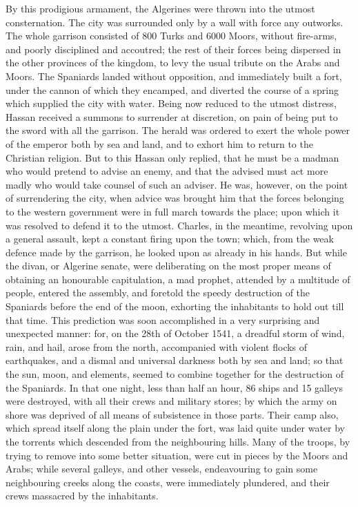 \documentclass{article}
\begin{document}
By this prodigious armament, the Algerines were thrown into the utmost consternation. The city was surrounded only by a wall with force any outworks. The whole garrison consisted of 800 Turks and 6000 Moors, without fire-arms, and poorly disciplined and accoutred; the rest of their forces being dispersed in the other provinces of the kingdom, to levy the usual tribute on the Arabs and Moors. The Spaniards landed without opposition, and immediately built a fort, under the cannon of which they encamped, and diverted the course of a spring which supplied the city with water. Being now reduced to the utmost distress, Hassan received a summons to surrender at discretion, on pain of being put to the sword with all the garrison. The herald was ordered to exert the whole power of the emperor both by sea and land, and to exhort him to return to the Christian religion. But to this Hassan only replied, that he must be a madman who would pretend to advise an enemy, and that the advised must act more madly who would take counsel of such an adviser. He was, however, on the point of surrendering the city, when advice was brought him that the forces belonging to the western government were in full march towards the place; upon which it was resolved to defend it to the utmost. Charles, in the meantime, revolving upon a general assault, kept a constant firing upon the town; which, from the weak defence made by the garrison, he looked upon as already in his hands. But while the divan, or Algerine senate, were deliberating on the most proper means of obtaining an honourable capitulation, a mad prophet, attended by a multitude of people, entered the assembly, and foretold the speedy destruction of the Spaniards before the end of the moon, exhorting the inhabitants to hold out till that time. This prediction was soon accomplished in a very surprising and unexpected manner: for, on the 28th of October 1541, a dreadful storm of wind, rain, and hail, arose from the north, accompanied with violent flocks of earthquakes, and a dismal and universal darkness both by sea and land; so that the sun, moon, and elements, seemed to combine together for the destruction of the Spaniards. In that one night, less than half an hour, 86 ships and 15 galleys were destroyed, with all their crews and military stores; by which the army on shore was deprived of all means of subsistence in those parts. Their camp also, which spread itself along the plain under the fort, was laid quite under water by the torrents which descended from the neighbouring hills. Many of the troops, by trying to remove into some better situation, were cut in pieces by the Moors and Arabs; while several galleys, and other vessels, endeavouring to gain some neighbouring creeks along the coasts, were immediately plundered, and their crews massacred by the inhabitants.
\end{document}
